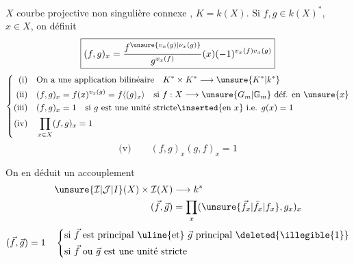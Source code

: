\begin{flushright}\end{flushright}

$X$ courbe projective non singulière connexe  , $K=k(X)$.
Si $f,g\in k(X)^*$, $x\in X$, on définit
\[
\boxed{(f,g)_x=\frac{f^{\unsure{v_x(g)|\nu_x(g)}}}{g^{v_x(f)}}(x)(-1)^{v_x(f)v_x(g)}}
\]
\[
\left\{\begin{aligned}
\text{(i)}\quad&\text{On a une application bilinéaire}\quad K^*\times K^*\longrightarrow\unsure{K^*|k^*}\\
\text{(ii)}\quad&(f,g)_x=f(x)^{v_x(g)}=f\langle(g)_x\rangle\quad\text{si }f:X\longrightarrow\unsure{G_m|\mathbb G_m}\text{ déf. en }\unsure{x}\\
\text{(iii)}\quad&(f,g)_x=1\quad\text{si }g\text{ est une unité stricte}\inserted{\text{en }x}\text{ i.e. }g(x)=1\\
\text{(iv)}\quad&\prod_{x\in X}(f,g)_x=1
\end{aligned}\right.
\]
\[
\text{(v)}\qquad(f,g)_x(g,f)_x=1
\]

On en déduit un accouplement
\[
\begin{aligned}
\unsure{\mathcal I|\mathcal J|I}(X)\times\mathcal I(X)&\longrightarrow k^*\\
(\vec f,\vec g)&=\prod_x(\unsure{\vec f_x|\bar f_x|f_x},g_x)_x
\end{aligned}
\]
\[
(\vec f,\vec g)=1\quad\left\{\begin{aligned}
&\text{si }\vec f\text{ est principal \uline{et} }\vec g\text{ principal}\ \deleted{\illegible{1}}\\
&\text{si }\vec f\text{ ou }\vec g\text{ est une unité stricte}
\end{aligned}\right.
\]

